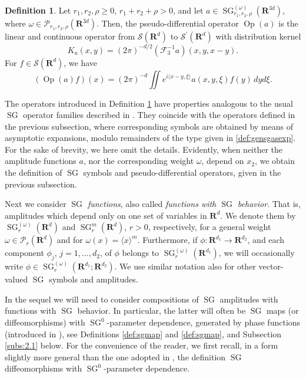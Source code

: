 \documentclass[12pt,a4paper,reqno]{amsart}
\numberwithin{equation}{section}
\numberwithin{thm}{section}
\theoremstyle{definition}
\newtheorem{defn}[thm]{Definition}
\theoremstyle{remark}
\begin{document}
\begin{defn}
\label{def:psidoamp}
Let $r_1,r_2,\rho\ge0$, $r_1+r_2+\rho>0$, and
let $a\in {\operatorname{SG}}^{(\omega)}_{r_1,r_2,\rho}({\mathbf R^{{3d}}})$, where $\omega \in
{\mathscr P}_{r_1,r_2,\rho}({\mathbf R^{{3d}}})$. Then, the pseudo-differential operator
${\operatorname{Op}}(a)$ is the linear and continuous operator from ${{\mathscr S}}({\mathbf R^{d}})$ to
${{\mathscr S}}^\prime({\mathbf R^{d}})$ with distribution kernel
\[
	K_{a}(x,y)=(2\pi )^{-d/2}(\mathscr F_3^{-1}a)(x,y,x-y).
\]
For $f\in{{\mathscr S}}({\mathbf R^{d}})$, we have
\[
	({\operatorname{Op}}(a)f)(x)=(2\pi)^{-d}\iint e^{i {\langle {x-y},\xi\rangle}} a(x,y,\xi)f(y)\,dyd\xi.
\]
\end{defn}
The operators introduced in Definition \ref{def:psidoamp} have properties
analogous to the usual ${\operatorname{SG}}$ operator families described in \cite{Co}.
They coincide with the operators defined in the previous subsection,
where corresponding symbols are obtained by means of asymptotic
expansions, modulo remainders of
the type given in \eqref{def:gensgasexp}.
For the sake of brevity, we here omit the details. Evidently, when
neither the amplitude functions $a$, nor the corresponding weight $\omega$,
depend on $x_2$, we obtain the definition of
${\operatorname{SG}}$ symbols and pseudo-differential operators, given in the
previous subsection.

\par

Next we consider \emph{${\operatorname{SG}}$ functions}, also called
\emph{functions with ${\operatorname{SG}}$ behavior}. That is, amplitudes which
depend only on one set of variables in ${\mathbf R^{d}}$. We denote them
by ${\operatorname{SG}} ^{(\omega )}_r({\mathbf R^{d}})$ and ${\operatorname{SG}}^{m}_r({\mathbf R^{d}})$, $r>0$,
respectively, for a general weight $\omega\in{\mathscr P}_{r}({\mathbf R^{{d}}})$
and for $\omega(x)={\langle x\rangle}^m$. Furthermore, if
$\phi \colon {\mathbf R^{{d_1}}} \to {\mathbf R^{{d_2}}}$,
and each component $\phi _j$, $j=1, \dots, d_2$, of $\phi$ belongs to
${\operatorname{SG}}^{(\omega)}_r({\mathbf R^{{d_1}}})$, we will occasionally write $\phi \in
{\operatorname{SG}}^{(\omega)} _r({\mathbf R^{{d_1}}};{\mathbf R^{{d_2}}})$. We use similar notation
also for other vector-valued ${\operatorname{SG}}$ symbols and amplitudes.

\par

In the sequel we will need to consider compositions of ${\operatorname{SG}}$
amplitudes with functions with ${\operatorname{SG}}$ behavior. In particular,
the latter will often be ${\operatorname{SG}}$ maps (or diffeomorphisms) with
${\operatorname{SG}}^0$-parameter dependence, generated by phase
functions (introduced in \cite{coriasco}), 
see Definitions \ref{def:sgmap} and \ref{def:sgmap}, and
Subsection \ref{subs:2.1} below. For the convenience of the
reader, we first recall, in a form slightly more general than the 
one adopted in \cite{coriasco}, the definition ${\operatorname{SG}}$
diffeomorphisms with ${\operatorname{SG}}^0$-parameter dependence.
\end{document}
